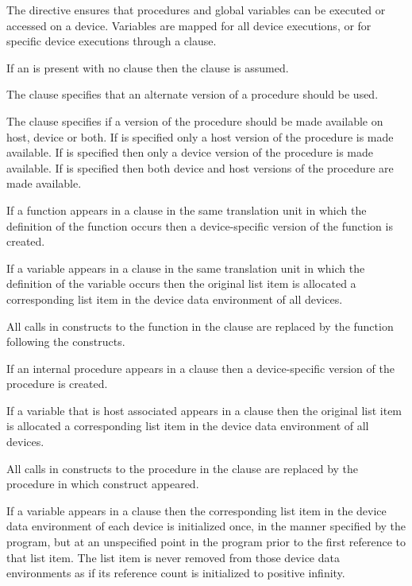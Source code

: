 \descr

The   directive ensures that procedures
and global variables can be executed or accessed on a device.
Variables are mapped for all device executions, or for specific
device executions through a  clause.

If an  is present with no clause then the 
clause is assumed.

The  clause specifies that an alternate version of a 
procedure should be used.

The  clause specifies if a version of the procedure should be made
available on host, device or both. If  is specified only a host version
of the procedure is made available.  If  is specified then only a device
version of the procedure is made available.  If  is specified then both
device and host versions of the procedure are made available.

\begin{ccppspecific}
If a function appears in a  clause in the same translation unit in which 
the definition of the function occurs then a device-specific version of the function 
is created.

If a variable appears in a  clause in the same translation unit in which 
the definition of the variable occurs then the original list item is allocated a 
corresponding list item in the device data environment of all devices.

All calls in  constructs to the function in the  clause
are replaced by the function following the   constructs.
\end{ccppspecific}

\begin{fortranspecific}
If an internal procedure appears in a  clause
then a device-specific version of the procedure is created.

If a variable that is host associated appears in a  clause
then the original list item is allocated a corresponding list item in the
device data environment of all devices.

All calls in  constructs to the procedure in the 
clause are replaced by the procedure in which   
construct appeared.
\end{fortranspecific}

If a variable appears in a  clause then the corresponding list
item in the device data environment of each device is initialized once, in the
manner specified by the program, but at an unspecified point in the program
prior to the first reference to that list item.  The list item is never removed
from those device data environments as if its reference count is initialized to
positive infinity.

